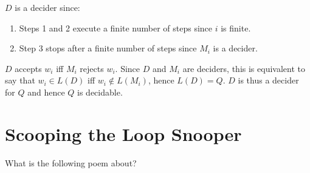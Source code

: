 \documentclass{article}
\begin{document}
\(D\) is a decider since:
\begin{enumerate}
\item Steps 1 and 2 execute a finite number of steps since \(i\) is finite.
\item Step 3 stops after a finite number of steps since \(M_i\) is a decider.
\end{enumerate}

\(D\) accepts \(w_i\) iff \(M_i\) rejects \(w_i\). Since \(D\) and \(M_i\) are
deciders, this is equivalent to say
that \(w_i \in L(D)\) iff \(w_i \not\in L(M_i)\), hence \(L(D) = Q\).
\(D\) is thus a decider for \(Q\) and hence \(Q\) is decidable.

\section{Scooping the Loop Snooper}
What is the following poem about?
\end{document}
